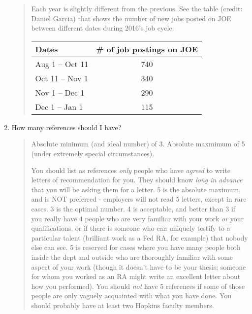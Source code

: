 \documentclass{\classes/econtex}
\providecommand\phantomsection{}
\begin{document}
\begin{enumerate}
  \begin{quote}
    Each year is slightly different from the previous. See the table (credit: Daniel Garcia) 
    that shows the number of new jobs posted on JOE between different dates 
    during 2016's job cycle:
    \ifdvi\phantomsection\hypertarget{JobPostDates}{}\fi
    \begin{table}[h]
      \centering
      \begin{tabular}{|l|c|}
        \hline
        Dates                   & \# of job postings on JOE \\ \hline
        Aug 1 -- Oct 11   & 740                       \\ \hline
        Oct 11 -- Nov 1 & 340                       \\ \hline
        Nov 1 -- Dec 1 & 290                       \\ \hline
        Dec 1 -- Jan 1  & 115                       \\ \hline
      \end{tabular}
    \end{table}
  \end{quote}

\item How many references should I have?

  \begin{quote}
    Absolute minimum (and ideal number) of 3.  Absolute maxmimum of 5 (under
    extremely special circumstances).  

    You should list as references \textit{only} people who have \textit{agreed}
    to write letters of recommendation for you.  They should know \textit{long in advance} that you will be asking them for a letter.  5 is the absolute
    maximum, and is NOT preferred - employers will not read 5 letters,
    except in rare cases.  3 is the optimal number.  4 is acceptable, and
    better than 3 if you really have 4 people who are very familiar with
    your work \textit{or} your qualifications, or if there is someone who can
    uniquely testify to a particular talent (brilliant work as a Fed RA,
    for example) that nobody else can see.  5 is reserved for cases where
    you have many people both inside the dept and outside who are
    thoroughly familiar with some aspect of your work (though it doesn't
    have to be your thesis; someone for whom you worked as an RA might
    write an excellent letter about how you performed).  You should \textit{not} have 5 references if some of those people are only vaguely
    acquainted with what you have done.  You should probably have at least
    two Hopkins faculty members.


\end{quote}
\end{enumerate}
\end{document}
